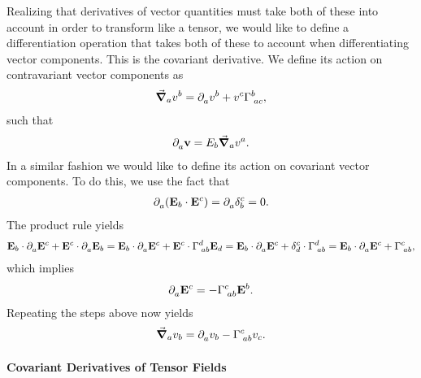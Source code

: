 Realizing that derivatives of vector quantities must take both of these into account in order to transform like a tensor, we would like to define a differentiation operation that takes both of these to account when differentiating vector components. This is the covariant derivative. We define its action on contravariant vector components as
\begin{align*}
	\grad_{a}{v^{b}} = \partial^{}_{a}v^{b} + v^{c}\Gamma^{b}_{\;ac},
\end{align*}
such that
\begin{align*}
	\partial^{}_{a}\vb{v} = E_{b}\grad_{a}{v^{a}}.
\end{align*}
In a similar fashion we would like to define its action on covariant vector components. To do this, we use the fact that
\begin{align*}
	\partial^{}_{a}(\vb{E}_{b}\cdot\vb{E}^{c}) = \partial^{}_{a}\delta_{b}^{c} = 0.
\end{align*}
The product rule yields
\begin{align*}
	\vb{E}_{b}\cdot\partial^{}_{a}\vb{E}^{c} + \vb{E}^{c}\cdot\partial^{}_{a}\vb{E}_{b} = \vb{E}_{b}\cdot\partial^{}_{a}\vb{E}^{c} + \vb{E}^{c}\cdot\Gamma^{d}_{\;ab}\vb{E}_{d} = \vb{E}_{b}\cdot\partial^{}_{a}\vb{E}^{c} + \delta_{d}^{c}\cdot\Gamma^{d}_{\;ab} = \vb{E}_{b}\cdot\partial^{}_{a}\vb{E}^{c} + \Gamma^{c}_{\;ab},
\end{align*}
which implies
\begin{align*}
	\partial^{}_{a}\vb{E}^{c} = -\Gamma^{c}_{\;ab}\vb{E}^{b}.
\end{align*}
Repeating the steps above now yields
\begin{align*}
	\grad_{a}{v_{b}} = \partial^{}_{a}v_{b} - \Gamma^{c}_{\;ab}v_{c}.
\end{align*}

\paragraph{Covariant Derivatives of Tensor Fields}

